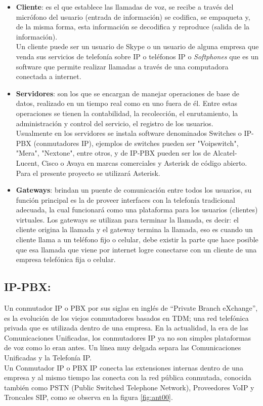 \documentclass[conference]{IEEEtran}
\begin{document}
\begin{itemize}
\item \textbf{Cliente}: es el que establece las llamadas de voz, se recibe a través del micrófono del usuario (entrada de información) se codifica, se empaqueta y, de la misma forma, esta información se decodifica y reproduce (salida de la información).\\
Un cliente puede ser un usuario de Skype o un usuario de alguna empresa que venda sus servicios de telefonía sobre IP o teléfonos IP o \textit{Softphones} que es un software que permite realizar llamadas a través de una computadora conectada a internet.

\item \textbf{Servidores}: son los que se encargan de manejar operaciones de base de datos, realizado en un tiempo real como en uno fuera de él. Entre estas operaciones se tienen la contabilidad, la recolección, el enrutamiento, la administración y control del servicio, el registro de los usuarios.\\
Usualmente en los servidores se instala software denominados Switches o IP-PBX (conmutadores IP), ejemplos de switches pueden ser "Voipswitch", "Mera", "Nextone", entre otros, y de IP-PBX pueden ser los de Alcatel-Lucent, Cisco o Avaya en marcas comerciales y Asterisk de código abierto. Para el presente proyecto se utilizará Asterisk.
\item \textbf{Gateways}: brindan un puente de comunicación entre todos los usuarios, su función principal es la de proveer interfaces con la telefonía tradicional adecuada, la cual funcionará como una plataforma para los usuarios (clientes) virtuales. Los gateways se utilizan para terminar la llamada, es decir: el cliente origina la llamada y el gateway termina la llamada, eso es cuando un cliente llama a un teléfono fijo o celular, debe existir la parte que hace posible que esa llamada que viene por internet logre conectarse con un cliente de una empresa telefónica fija o celular.
\end{itemize}
\subsection{\textbf{ IP-PBX:}}  
Un conmutador IP o PBX por sus siglas en inglés de “Private Branch eXchange”, es la evolución de los viejos conmutadores basados en TDM; una red telefónica privada que es utilizada dentro de una empresa. En la actualidad, la era de las Comunicaciones Unificadas, los conmutadores IP ya no son simples plataformas de voz como lo eran antes. Un línea muy delgada separa las Comunicaciones Unificadas y la Telefonía IP.\\
Un Conmutador IP o PBX IP conecta las extensiones internas dentro de una empresa y al mismo tiempo las conecta con la red pública conmutada, conocida también como PSTN (Public Switched Telephone Network), Proveedores VoIP y Troncales SIP, como se observa en la figura \ref{fig:ant00}.
\end{document}
